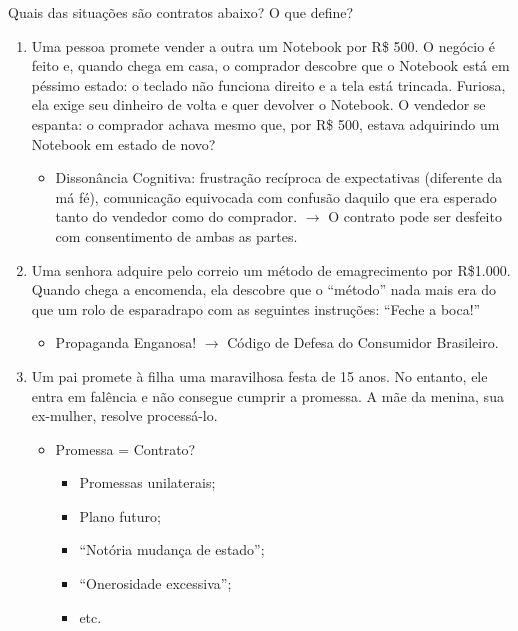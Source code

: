 \documentclass[a4paper,12pt]{article}[abntex2]
\begin{document}
Quais das situações são contratos abaixo? O que define? \begin{enumerate}
    \item Uma pessoa promete vender a outra um Notebook por R\$ 500. O negócio é feito e, quando chega em casa, o comprador descobre que o Notebook está em péssimo estado: o teclado não funciona direito e a tela está trincada. Furiosa, ela exige seu dinheiro de volta e quer devolver o Notebook. O vendedor se espanta: o comprador achava mesmo que, por R\$ 500, estava adquirindo um Notebook em estado de novo?
    \begin{itemize}
        \item Dissonância Cognitiva: frustração recíproca de expectativas (diferente da má fé), comunicação equivocada com confusão daquilo que era esperado tanto do vendedor como do comprador. \(\rightarrow\) O contrato pode ser desfeito com consentimento de ambas as partes.
    \end{itemize}

    \item Uma senhora adquire pelo correio um método de emagrecimento por R\$1.000. Quando chega a encomenda, ela descobre que o “método” nada mais era do que um rolo de esparadrapo com as seguintes instruções: “Feche a boca!”
    \begin{itemize}
        \item Propaganda Enganosa! \(\rightarrow\) Código de Defesa do Consumidor Brasileiro. 
    \end{itemize}

    \item Um pai promete à filha uma maravilhosa festa de 15 anos. No entanto, ele entra em falência e não consegue cumprir a promessa. A mãe da menina, sua ex-mulher, resolve processá-lo.
    \begin{itemize}
        \item Promessa = Contrato?
        \begin{itemize}
	        \item Promessas unilaterais;
	        \item Plano futuro;
	        \item “Notória mudança de estado”;
	        \item “Onerosidade excessiva”;
	        \item etc.
        \end{itemize}
    \end{itemize} 
\end{enumerate}
\end{document}
